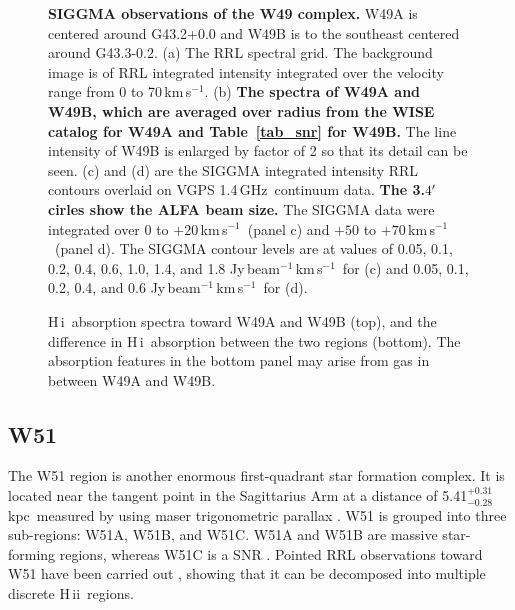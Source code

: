 \documentclass[manuscript]{aastex61}
\newcommand{\hii}{{\rm H\,}{{\sc ii}}}
\newcommand{\hi}{{\rm H\,}{{\sc i}}}
\newcommand{\kms}{\,km\,s$^{-1}$}
\newcommand{\kpc}{\,kpc}
\newcommand{\ghz}{\,GHz}
\begin{document}
\begin{figure}[htbp]
\caption{\textbf{SIGGMA observations of the W49 complex.} W49A is centered around G43.2+0.0 and W49B is to the southeast centered around G43.3-0.2.
(a) The RRL spectral grid. The background image is of RRL integrated intensity integrated over the velocity range from 0 to 70\kms.
(b) \textbf{The spectra of W49A and W49B, which are averaged over radius from the WISE catalog for W49A and Table~\ref{tab_snr} for W49B.} The line intensity of W49B is enlarged by factor of 2 so that its detail can be seen.
(c) and (d) are the SIGGMA integrated intensity RRL contours overlaid on VGPS 1.4\ghz\ continuum data. \textbf{The 3.$4\mbox{$^\prime$}$ cirles show the ALFA beam size.} The SIGGMA data were integrated over $0$ to $+20$\kms\ (panel c) and $+50$ to $+70$\kms\ (panel d).
The SIGGMA contour levels are at values of 0.05, 0.1, 0.2, 0.4, 0.6, 1.0, 1.4, and 1.8 Jy\,beam$^{-1}$\kms\ for (c) and 0.05, 0.1, 0.2, 0.4, and 0.6 Jy\,beam$^{-1}$\kms\ for (d).
}\label{w49_spec_map}
\end{figure}

\begin{figure}[htbp]
\centering
{}
\caption{\hi\ absorption spectra toward W49A and W49B (top), and the difference in \hi\ absorption between the two regions (bottom). The absorption features in the bottom panel may arise from gas in between W49A and W49B. 
}\label{w49_hi}
\end{figure}
\subsection{W51}
The W51 region is another enormous first-quadrant star formation complex.
It is located near the tangent point in the Sagittarius Arm at a distance of 5.41$^{+0.31}_{-0.28}$\kpc\ measured by using maser trigonometric parallax \citep{Sato2010}.  W51 is grouped into three sub-regions: W51A, W51B, and W51C.
W51A and W51B are massive star-forming regions, whereas W51C is a SNR \citep{Subrahmanyan1995}.
Pointed RRL observations toward W51 have been carried out \citep[i.e.][]{Mezger1967b,Terzian1969,Pankonin1979,Roelfsema1992b, Anderson2011}, showing that it can be decomposed into multiple discrete \hii\ regions.
\end{document}
